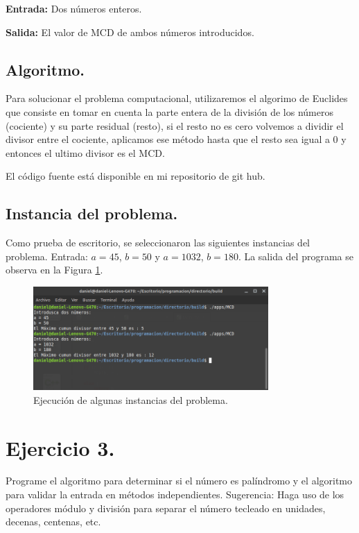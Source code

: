 \documentclass[12pt,letterpaper]{article}
\begin{document}
{\textbf{Entrada:} Dos n\'umeros enteros.

\textbf{Salida:} El valor de MCD de ambos n\'umeros introducidos.

\subsection{Algoritmo.}
Para solucionar el problema computacional, utilizaremos el algorimo de Euclides \cite{url:euclides} que consiste en tomar en cuenta la parte entera de la divisi\'on de los n\'umeros (cociente) y su parte residual (resto), si el resto no es cero volvemos a dividir el divisor entre el cociente, aplicamos ese m\'etodo hasta que el resto sea igual a 0 y entonces el ultimo divisor es el MCD.


El código fuente está disponible en mi repositorio de git hub. \cite{url:MCD}

\subsection{Instancia del problema.}
Como prueba de escritorio, se seleccionaron las siguientes instancias del problema. Entrada: $a=45 $, $b=50$ y $a=1032$, $b=180$. La salida del programa se observa en la Figura \ref{fig:MCD}.
\begin{figure}[ht!]
  \centering
  \includegraphics[width=0.8\textwidth]{figures/MCD}
  \caption{Ejecución de algunas instancias del problema.}
  \label{fig:MCD}
\end{figure}

\newpage

\section{Ejercicio 3.}

Programe el algoritmo para determinar si el n\'umero es pal\'indromo y el algoritmo para validar la entrada en m\'etodos independientes.
Sugerencia: Haga uso de los operadores m\'odulo y divisi\'on para separar el n\'umero tecleado en unidades, decenas, centenas, etc.

}
\end{document}
